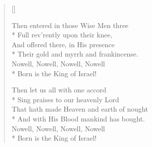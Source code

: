 \begin{verse}[\versewidth]
\begin{patverse}
Then entered in those Wise Men three\\*
          Full rev'rently upon their knee,\\
         And offered there, in His presence\\*
      Their gold and myrrh and frankincense.\\
              Nowell, Nowell, Nowell, Nowell\\*
           Born is the King of Israel!
\end{patverse}

\begin{patverse}
Then let us all with one accord\\*
         Sing praises to our heavenly Lord\\
     That hath made Heaven and earth of nought\\*
      And with His Blood mankind has bought.\\
              Nowell, Nowell, Nowell, Nowell\\*
            Born is the King of Israel!
\end{patverse}
	    
\end{verse}


